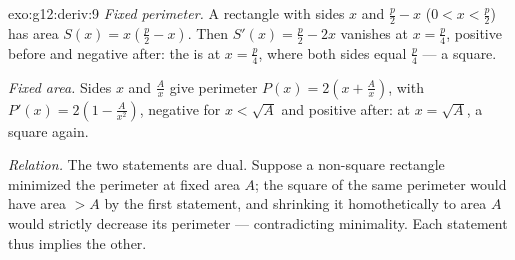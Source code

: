 \begin{solution}{exo:g12:deriv:9}
\emph{Fixed perimeter.} A rectangle with sides $x$ and $\frac{p}{2} - x$
($0 < x < \frac p2$) has area $S(x) = x\left(\frac p2 - x\right)$. Then
$S'(x) = \frac p2 - 2x$ vanishes at $x = \frac p4$, positive before and
negative after: the  is at $x = \frac{p}{4}$, where both sides equal
$\frac p4$ --- a square.

\emph{Fixed area.} Sides $x$ and $\frac Ax$ give perimeter
$P(x) = 2\left(x + \frac Ax\right)$, with
$P'(x) = 2\left(1 - \frac{A}{x^2}\right)$, negative for $x < \sqrt A$ and
positive after:  at $x = \sqrt{A}$, a square again.

\emph{Relation.} The two statements are dual. Suppose a non-square rectangle
minimized the perimeter at fixed area $A$; the square of the same perimeter
would have area $> A$ by the first statement, and shrinking it homothetically
to area $A$ would strictly decrease its perimeter --- contradicting
minimality. Each statement thus implies the other.
\end{solution}

